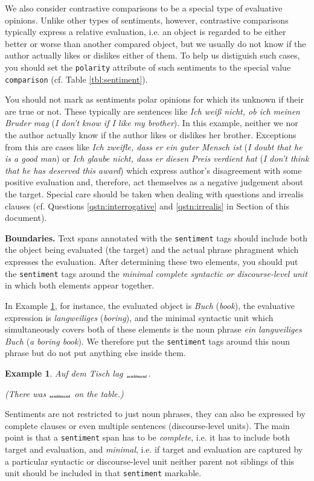 \documentclass[11pt,a4paper]{article}
\theoremstyle{mytheoremstyle}
\newtheorem{exmp}{Example}[section]
\newcommand{\mtag}[2]{{\upshape[\emph{#2}\upshape]$_{\textrm{\bfseries\emph{\tiny
        #1}}}$}}
\newcommand{\sentiment}[2][]{\mtag{sen\-ti\-ment\ifstrempty{#1}{}{:#1}}{#2}}
\begin{document}
We also consider contrastive comparisons to be a special type of
evaluative opinions.  Unlike other types of sentiments, however,
contrastive comparisons typically express a relative evaluation,
i.e. an object is regarded to be either better or worse than another
compared object, but we usually do not know if the author actually
likes or dislikes either of them.  To help us distiguish such cases,
you should set the \texttt{polarity} attribute of such sentiments to
the special value \texttt{comparison} (cf. Table \ref{tbl:sentiment}).

You should not mark as sentiments polar opinions for which its unknown
if their are true or not.  These typically are sentences like
\textit{Ich wei\ss{} nicht, ob ich meinen Bruder mag} (\textit{I don't
  know if I like my brother}).  In this example, neither we nor the
author actually know if the author likes or dislikes her brother.
Exceptions from this are cases like \textit{Ich zweifle, dass er ein
  guter Mensch ist} (\textit{I doubt that he is a good man}) or
\textit{Ich glaube nicht, dass er diesen Preis verdient hat}
(\textit{I don't think that he has deserved this award}) which express
author's disagreement with some positive evaluation and, therefore,
act themselves as a negative judgement about the target.  Special care
should be taken when dealing with questions and irrealis clauses
(cf. Questions \ref{qstn:interrogative} and \ref{qstn:irrealis} in
 Section of this document).

\noindent\textbf{Boundaries.} Text spans annotated with the
\texttt{sentiment} tags should include both the object being evaluated
(the target) and the actual phrase phragment which expresses the
evaluation.  After determining these two elements, you should put the
\texttt{sentiment} tags around the \emph{minimal complete syntactic or
  discourse-level unit} in which both elements appear together.

In Example \ref{exmp:book}, for instance, the evaluated object is
\textit{Buch} (\textit{book}), the evaluative expression is
\textit{langweiliges} (\textit{boring}), and the minimal syntactic
unit which simultaneously covers both of these elements is the noun
phrase \textit{ein langweiliges Buch} (\textit{a boring book}).  We
therefore put the \texttt{sentiment} tags around this noun phrase but
do not put anything else inside them.
\begin{exmp}
  Auf dem Tisch lag \sentiment{ein langweiliges Buch}.

  (There was \sentiment{a boring book} on the table.)\label{exmp:book}
\end{exmp}
Sentiments are not restricted to just noun phrases, they can also be
expressed by complete clauses or even multiple sentences
(discourse-level units).  The main point is that a \texttt{sentiment}
span has to be \emph{complete}, i.e. it has to include both target and
evaluation, and \emph{minimal}, i.e. if target and evaluation are
captured by a particular syntactic or discourse-level unit neither
parent not siblings of this unit should be included in that
\texttt{sentiment} markable.
\end{document}
